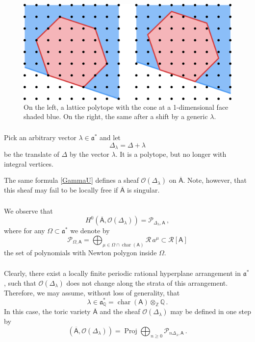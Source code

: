 \documentclass[14pt]{extarticle}
\newcommand{\Q}{\mathbb{Q}}
\newcommand{\Z}{\mathbb{Z}}
\newcommand{\bA}{\mathsf{A}}
\newcommand{\cR}{\mathscr{R}}
\newcommand{\cP}{\mathscr{P}}
\newcommand{\bbA}{\overline{\bA}}
\newcommand{\cO}{\mathscr{O}}
\newcommand{\fa}{\mathfrak{a}}
\DeclareMathOperator{\cha}{char}
\DeclareMathOperator{\Proj}{Proj}
\theoremstyle{definition}
\begin{document}
\begin{figure}[!h]
  \centering
  \includegraphics[scale=0.64]{polytope1.png}
  \caption{On the left, a lattice polytope with the cone at a
    1-dimensional face shaded blue. On the right, the same after a
    shift by a generic $\lambda$.}
\label{fpolytope}
\end{figure}

\subsubsection{}\label{s_O_Delta_lambda} 

Pick an arbitrary vector
$
\lambda \in  \fa^*
$
and let
$$
\Delta_\lambda = \Delta + \lambda
$$
be the translate of $\Delta$ by the vector $\lambda$. It is a
polytope, but no longer with integral vertices.

The same formula
\eqref{GammaU} defines a sheaf $\cO(\Delta_\lambda)$ on
$\bbA$. Note, however, that this sheaf may fail to be locally
free if $\bbA$ is singular.

\subsubsection{} 

We observe that
  \begin{equation}
    H^0(\bbA, \cO(\Delta_\lambda))= \cP_{\Delta_\lambda,\bA}
      \,, \label{H0D} 
  \end{equation}
  where for any $\Omega \subset \fa^*$ we denote by 
  $$
  \cP_{\Omega,\bA} = 
      \bigoplus_{\mu \in
        \Omega \cap \cha(\bA)} \cR \, a^\mu  \subset \cR[\bA] 
      $$
      the set of polynomials  with Newton polygon inside
      $\Omega$. 


      \subsubsection{}
Clearly, there exist a locally finite periodic rational hyperplane
arrangement in $\fa^*$, such that $\cO(\Delta_\lambda)$ does not
change along the strata of this arrangement. Therefore, we may
assume, without loss of generality, that
$$
\lambda \in \fa_\Q^* = \cha(\bA)
  \otimes_\Z \Q \, .
  $$
  In this case, the toric variety $\bbA$ and the sheaf
  $\cO(\Delta_\lambda)$ may
  be defined in one step by
  \begin{equation}
  (\bbA, \cO(\Delta_\lambda)) = \Proj \bigoplus_{n\ge 0} \cP_{n
    \Delta_\lambda,\bA} \,.
\label{Proj1}
\end{equation}
%
\end{document}
